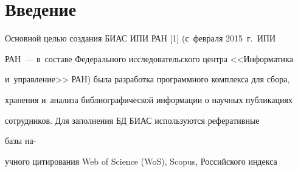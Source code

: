 









\vspace*{-8pt}
















      \thispagestyle{headings}





\section{Введение}





\vspace*{-2pt}





  Основной целью создания БИАС ИПИ РАН [1] (с~февраля 2015~г.\ ИПИ


  РАН~--- в~составе Федерального исследовательского центра <<Информатика


и~управление>> РАН) была разработка программного комплекса для сбора,


хранения и~анализа библиографической информации о научных публикациях


сотрудников. Для заполнения БД БИАС используются реферативные


базы на-\linebreak\vspace*{-12pt}





\pagebreak





\noindent


учного цитирования Web of Science (WoS), Scopus, Российского индекса


